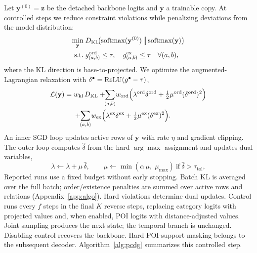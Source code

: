 Let $\mathbf{y}^{(0)}=\mathbf{z}$ be the detached backbone logits and $\mathbf{y}$
a trainable copy. At controlled steps we reduce constraint violations while
penalizing deviations from the model distribution:
\begin{equation}
\begin{aligned}
  \min_{\mathbf{y}}\;&D_{\mathrm{KL}}\!\big(\mathrm{softmax}(\mathbf{y}^{(0)})\,\big\|\,\mathrm{softmax}(\mathbf{y})\big)\\
  \text{s.t.}\;&g^{\mathrm{ord}}_{(a,b)}\le\tau,\quad g^{\mathrm{ex}}_{(a,b)}\le\tau
  \quad\forall(a,b),
\end{aligned}
  \label{eq:constrained}
\end{equation}
where the KL direction is base-to-projected. We optimize the
augmented-Lagrangian relaxation with
$\delta^{\bullet}=\mathrm{ReLU}(g^{\bullet}-\tau)$,
\begin{equation}
\begin{aligned}
  \mathcal{L}(\mathbf{y}) =\; & w_{\mathrm{kl}}\,D_{\mathrm{KL}}
   + \!\!\sum_{(a,b)}\! w_{\mathrm{ord}}\Big(\lambda^{\mathrm{ord}}\delta^{\mathrm{ord}}
     + \tfrac{1}{2}\mu^{\mathrm{ord}}(\delta^{\mathrm{ord}})^2\Big)\\
   & + \!\!\sum_{(a,b)}\! w_{\mathrm{ex}}\Big(\lambda^{\mathrm{ex}}\delta^{\mathrm{ex}}
     + \tfrac{1}{2}\mu^{\mathrm{ex}}(\delta^{\mathrm{ex}})^2\Big).
\end{aligned}
\label{eq:auglag}
\end{equation}
An inner SGD loop updates active rows of $\mathbf{y}$ with rate $\eta$ and
gradient clipping. The outer loop computes $\hat{\delta}$ from the hard
$\arg\max$ assignment and updates dual variables,
\begin{equation}
  \lambda \leftarrow \lambda + \mu\,\hat{\delta},\qquad
  \mu \leftarrow \min(\alpha\,\mu,\;\mu_{\max})\ \text{if}\ \hat{\delta}>\tau_{\mathrm{tol}},
  \label{eq:dual}
\end{equation}
Reported runs use a fixed budget without early stopping. Batch KL is averaged
over the full batch; order/existence penalties are summed over active rows and
relations (Appendix~\ref{app:algo}). Hard violations determine dual updates.
Control runs every $f$ steps in the final $K$ reverse steps, replacing category
logits with projected values and, when enabled, POI logits with distance-adjusted
values. Joint sampling produces the next state; the temporal branch is unchanged.
Disabling control recovers the backbone. Hard POI-support masking belongs to the
subsequent decoder. Algorithm~\ref{alg:pcdg} summarizes this controlled step.

